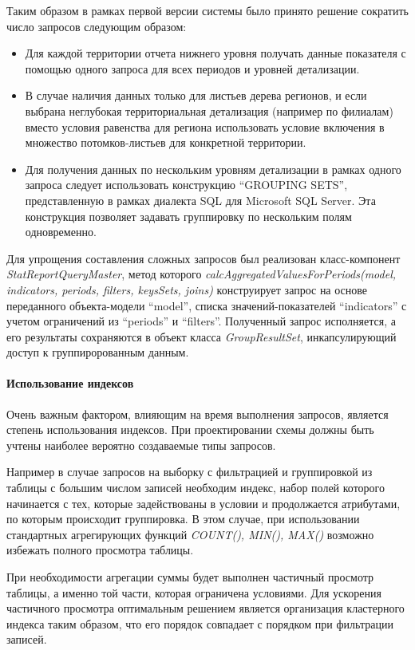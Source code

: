 Таким образом в рамках первой версии системы было принято решение сократить число запросов следующим образом:
\begin{itemize}
\item{
  Для каждой территории отчета нижнего уровня получать данные показателя
с помощью одного запроса для всех периодов и уровней детализации.
}
\item{
  В случае наличия данных только для листьев дерева регионов, и если выбрана 
неглубокая территориальная детализация (например по филиалам) вместо условия
равенства для региона использовать условие включения в множество потомков-листьев
для конкретной территории.
}
\item{
  Для получения данных по нескольким уровням детализации в рамках
одного запроса следует использовать конструкцию ``GROUPING SETS'',
представленную в рамках диалекта SQL для Microsoft SQL Server. 
Эта конструкция позволяет задавать группировку по нескольким полям
одновременно.
}
\end{itemize}

Для упрощения составления сложных запросов был реализован класс-компонент
\textit{StatReportQueryMaster}, метод которого 
\textit{calcAggregatedValuesForPeriods(model, indicators, periods, filters, keysSets, joins)}
конструирует запрос на основе переданного объекта-модели ``model'', списка 
значений-показателей ``indicators'' с учетом ограничений из ``periods'' и ``filters''.
Полученный запрос исполняется, а его результаты сохраняются в объект класса \textit{GroupResultSet},
инкапсулирующий доступ к группиророванным данным.

\paragraph{Использование индексов}
Очень важным фактором, влияющим на время выполнения запросов, является степень использования индексов.
При проектировании схемы должны быть учтены наиболее вероятно создаваемые типы запросов.

Например в случае запросов на выборку с фильтрацией и группировкой из таблицы с большим числом записей
необходим индекс, набор полей которого начинается с тех, которые задействованы в условии и продолжается
атрибутами, по которым происходит группировка. В этом случае, при использовании стандартных
агрегирующих функций \textit{COUNT(), MIN(), MAX()} возможно избежать полного просмотра таблицы.

При необходимости агрегации суммы будет выполнен частичный просмотр таблицы, а именно той части,
которая ограничена условиями. Для ускорения частичного просмотра оптимальным решением
является организация кластерного индекса таким образом, что его порядок совпадает с порядком
при фильтрации записей.

